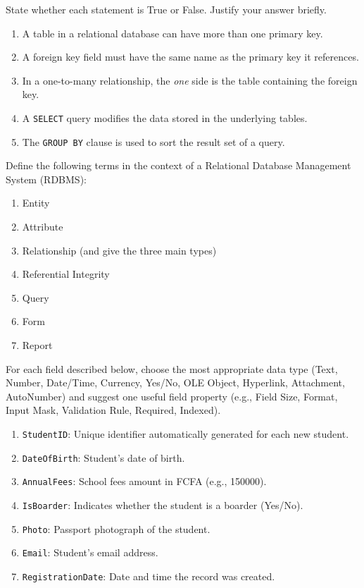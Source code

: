 \documentclass[11pt]{article}
\begin{document}
\begin{exercice}
State whether each statement is True or False. Justify your answer briefly.
\begin{enumerate}
\item A table in a relational database can have more than one primary key.
\item A foreign key field must have the same name as the primary key it references.
\item In a one-to-many relationship, the \emph{one} side is the table containing the foreign key.
\item A \texttt{SELECT} query modifies the data stored in the underlying tables.
\item The \texttt{GROUP BY} clause is used to sort the result set of a query.
\end{enumerate}
\end{exercice}

\begin{exercice}
Define the following terms in the context of a Relational Database Management System (RDBMS):
\begin{enumerate}
\item Entity
\item Attribute
\item Relationship (and give the three main types)
\item Referential Integrity
\item Query
\item Form
\item Report
\end{enumerate}
\end{exercice}

\begin{exercice}
For each field described below, choose the most appropriate data type (Text, Number, Date/Time, Currency, Yes/No, OLE Object, Hyperlink, Attachment, AutoNumber) and suggest one useful field property (e.g., Field Size, Format, Input Mask, Validation Rule, Required, Indexed).
\begin{enumerate}
\item \texttt{StudentID}: Unique identifier automatically generated for each new student.
\item \texttt{DateOfBirth}: Student's date of birth.
\item \texttt{AnnualFees}: School fees amount in FCFA (e.g., 150000).
\item \texttt{IsBoarder}: Indicates whether the student is a boarder (Yes/No).
\item \texttt{Photo}: Passport photograph of the student.
\item \texttt{Email}: Student's email address.
\item \texttt{RegistrationDate}: Date and time the record was created.
\end{enumerate}
\end{exercice}
\end{document}
